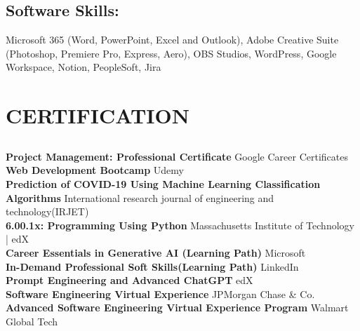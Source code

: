 \documentclass[a4paper]{deedy-resume} %
\begin{document}
\begin{minipage}[t]{0.33\textwidth}
\sectionspace %



\subsection{Software Skills: }

Microsoft 365 (Word, PowerPoint, Excel and Outlook), 
Adobe Creative Suite (Photoshop, Premiere Pro, Express, Aero),
OBS Studios, WordPress, Google Workspace, Notion, PeopleSoft, Jira


\sectionspace %


\section{CERTIFICATION}




\subsection{}


\textbf{Project Management: Professional Certificate} \textbullet{} Google Career Certificates   \\
\textbf{Web Development Bootcamp} \textbullet{} Udemy  \\
\textbf{Prediction of COVID-19 Using Machine Learning Classification Algorithms} \textbullet{} International research journal of engineering and technology(IRJET)   \\
\textbf{6.00.1x: Programming Using Python} \textbullet{} Massachusetts Institute of Technology | edX \\
\textbf{Career Essentials in Generative AI (Learning Path)} \textbullet{} Microsoft  \\
\textbf{In-Demand Professional Soft Skills(Learning Path)} \textbullet{} LinkedIn  \\
\textbf{Prompt Engineering and Advanced ChatGPT} \textbullet{} edX  \\
\textbf{Software Engineering Virtual Experience} \textbullet{} JPMorgan Chase \& Co. \\
\textbf{Advanced Software Engineering Virtual Experience Program} \textbullet{} Walmart Global Tech \\


\sectionspace %






\end{minipage} %
\end{document}
